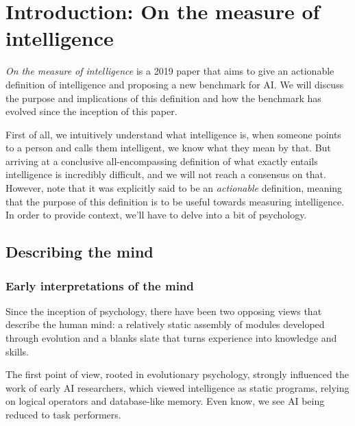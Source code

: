 \chapter{Introduction: On the measure of intelligence}

\begin{flushleft}
    \textit{On the measure of intelligence}\cite{cholletMeasureIntelligence2019} is a 2019 paper that aims to give an actionable definition of intelligence and proposing a new benchmark for AI. We will discuss the purpose and implications of this definition and how the benchmark has evolved since the inception of this paper.
\end{flushleft}

\begin{flushleft}
    First of all, we intuitively understand what intelligence is, when someone points to a person and calls them intelligent, we know what they mean by that. But arriving at a conclusive all-encompassing definition of what exactly entails intelligence is incredibly difficult, and we will not reach a consensus on that. However, note that it was explicitly said to be an \textit{actionable} definition, meaning that the purpose of this definition is to be useful towards measuring intelligence. In order to provide context, we'll have to delve into a bit of psychology.
\end{flushleft}


\section{Describing the mind}

\subsection{Early interpretations of the mind}

    \begin{flushleft}
        Since the inception of psychology, there have been two opposing views that describe the human mind\cite{spelkeCoreKnowledge2007}: a relatively static assembly of modules developed through evolution and a blanks slate that turns experience into knowledge and skills. 
    \end{flushleft}

    \begin{flushleft}
        The first point of view, rooted in evolutionary psychology, strongly influenced the work of early AI researchers, which viewed intelligence as static programs, relying on logical operators and database-like memory. Even know, we see AI being reduced to task performers. 
    \end{flushleft}

